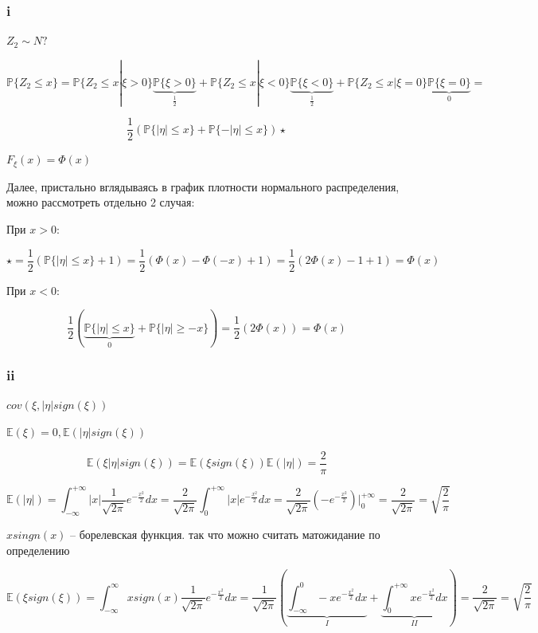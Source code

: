 \documentclass[a4paper,12pt]{article}
\def \mbb{\mathbb}
\def \P{\mbb{P}}
\def \E{\mbb{E}}
\begin{document}
\subsubsection{i}
$ Z_2 \sim N? $

\[ \P\{ Z_2 \le x \} = \P\{ Z_2 \le x | \xi > 0 \} \underbrace{\P\{ \xi > 0 \}}_{\frac{1}{2}} +  \P\{ Z_2 \le x | \xi < 0 \}\underbrace{ \P\{ \xi < 0 \} }_{\frac{1}{2}}+  \P\{ Z_2 \le x | \xi = 0 \} \underbrace{\P\{ \xi = 0 \}}_0 = \]

\[ \frac{1}{2} (\P\{ |\eta| \le x \} + \P\{ -|\eta| \le x \}) \star \]

$ F_{\xi}(x) = \Phi(x) $

Далее, пристально вглядываясь в график плотности нормального распределения, можно рассмотреть отдельно 2 случая:


При  $ x > 0  $:



\[ \star = \frac{1}{2}(\P\{ |\eta| \le x \} + 1) =  \frac{1}{2}(\Phi(x) - \Phi(-x) + 1) = \frac{1}{2}(2\Phi(x) - 1 + 1) = \Phi(x)\]


При $ x < 0 $:

\[ \frac{1}{2} (\underbrace{\P\{ |\eta| \le x \} }_0+ \P\{ |\eta| \ge -x \}) = \frac{1}{2}(2 \Phi(x)) = \Phi(x)\]




\subsubsection{ii}

$ cov(\xi, |\eta| sign(\xi)) $

$ \E(\xi) = 0, \E(|\eta| sign(\xi)) $

\[ \E(\xi |\eta| sign(\xi)) = \E(\xi sign(\xi)) \E(|\eta|) = \frac{2}{\pi}\]

\[ \E(|\eta|) = \int_{-\infty}^{+\infty} |x| \frac{1}{\sqrt{2\pi}} e^{-\frac{x^2}{2}} dx =  \frac{2}{\sqrt{2\pi}} \int_{0}^{+\infty} |x| e^{-\frac{x^2}{2}} dx =  \frac{2}{\sqrt{2\pi}}  \left( -e^{-\frac{x^2}{2}} \right) \Biggr|_0^{+\infty} = \frac{2}{\sqrt{2\pi}} = \sqrt{\frac{2}{\pi}}\]


$ xsingn(x)  $ -- борелевская функция. так что можно считать матожидание по определению

\[ \E(\xi sign(\xi)) =\int_{-\infty}^{\infty}  x sign(x) \frac{1}{\sqrt{2\pi}} e^{-\frac{x^2}{2}} dx  =  \frac{1}{\sqrt{2\pi}} \left( \underbrace{ \int_{-\infty}^{0} -x e^{-\frac{x^2}{2}} dx }_I + \underbrace{ \int_{0}^{+\infty} x e^{-\frac{x^2}{2}} dx }_{II}  \right) = \frac{2}{\sqrt{2\pi}} = \sqrt{\frac{2}{\pi}} \]
\end{document}
